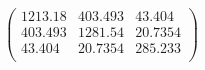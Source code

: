 \documentclass{article}
\begin{document}
\[\left(
\begin{array}{ccc}
 1213.18 & 403.493 & 43.404 \\
 403.493 & 1281.54 & 20.7354 \\
 43.404 & 20.7354 & 285.233 \\
\end{array}
\right)\]
\end{document}
